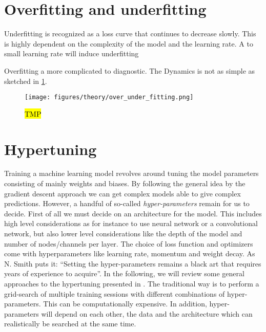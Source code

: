 \section{Overfitting and underfitting}




Underfitting is recognized as a loss curve that continues to decrease slowly. This is highly dependent on the complexity of the model and the learning rate. A to small learning rate will induce underfitting

Overfitting a more complicated to diagnostic. The Dynamics is not as simple as sketched in \cref{fig:over_under_fitting}.


\begin{figure}[H]
  \centering
  \texttt{[image: figures/theory/over\_under\_fitting.png]}
  \caption{\hl{TMP} \cite{smith2018disciplined}}
  \label{fig:over_under_fitting}
\end{figure}




\section{Hypertuning}
Training a machine learning model revolves around tuning the model parameters
consisting of mainly weights and biases. By following the general idea by the
gradient descent approach we can get complex models able to give complex
predictions. However, a handful of so-called \textit{hyper-parameters} remain
for us to decide. First of all we must decide on an architecture for the model.
This includes high level considerations as for instance to use neural network or
a convolutional network, but also lower level considerations like the depth of
the model and number of nodes/channels per layer. The choice of loss function
and optimizers come with hyperparameters like learning rate, momentum and weight
decay. As N. Smith \cite{smith2018disciplined} puts it: ``Setting the
hyper-parameters remains a black art that requires years of experience to
acquire''. In the following, we will review some general approaches to the
hypertuning presented in \cite{smith2018disciplined}. The traditional way is to
perform a grid-search of multiple training sessions with different combinations
of hyper-parameters. This can be computationally expensive. In addition, hyper-parameters will depend on each other, the data and the architecture which can realistically be searched at the same time. 

